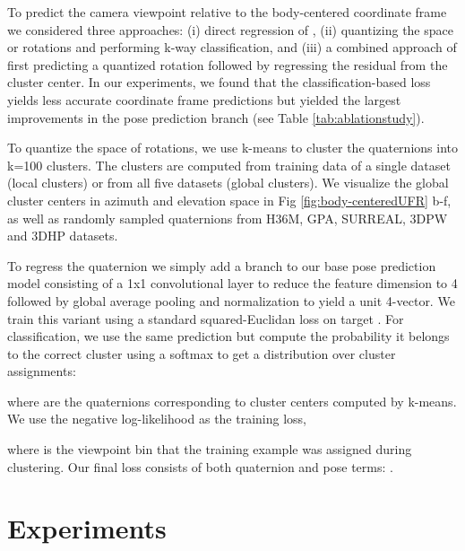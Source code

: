 \documentclass[runningheads]{llncs}
\begin{document}
To predict the camera viewpoint relative to the body-centered coordinate frame
we considered three approaches: (i) direct regression of , (ii)
quantizing the space or rotations and performing k-way classification, and
(iii) a combined approach of first predicting a quantized rotation
followed by regressing the residual from the cluster center. In our
experiments, we found that the classification-based loss yields less accurate
coordinate frame predictions but yielded the
largest improvements in the pose prediction branch (see Table \ref{tab:ablationstudy}).

To quantize the space of rotations, we use k-means to cluster the quaternions
into k=100 clusters. The clusters are computed from training data of a single
dataset (local clusters) or from all five datasets (global clusters).  We
visualize the global cluster centers in azimuth and elevation space in Fig
\ref{fig:body-centeredUFR} b-f, as well as randomly sampled quaternions from
H36M, GPA, SURREAL, 3DPW and 3DHP datasets. 

To regress the quaternion  we simply add a branch to our base pose prediction
model consisting of a 1x1 convolutional layer to reduce the feature dimension to 4
followed by global average pooling and normalization to yield a unit 4-vector.
We train this variant using a standard squared-Euclidan loss on target .
For classification, we use the same prediction  but compute the probability
it belongs to the correct cluster using a softmax to get a distribution over
cluster assignments:

where  are the quaternions corresponding to cluster centers computed
by k-means.  We use the negative log-likelihood as the training loss,

where  is the viewpoint bin that the training example was assigned
during clustering. Our final loss consists of both quaternion and pose terms:
.


\section{Experiments}
\label{sec:exp}
\end{document}
